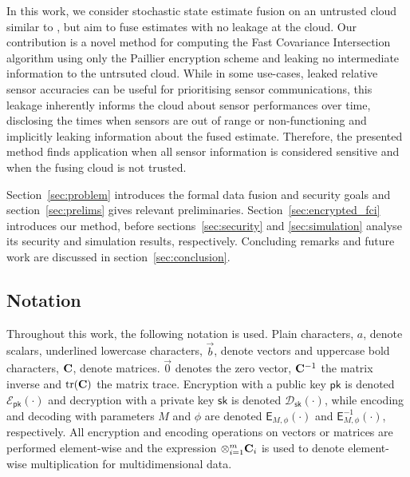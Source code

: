 \documentclass[letterpaper, 10 pt, conference]{ieeeconf}
\begin{document}
In this work, we consider stochastic state estimate fusion on an untrusted cloud similar to \cite{risticSecureFastCovariance2021}, but aim to fuse estimates with no leakage at the cloud. Our contribution is a novel method for computing the Fast Covariance Intersection algorithm using only the Paillier encryption scheme and leaking no intermediate information to the untrsuted cloud. While in some use-cases, leaked relative sensor accuracies can be useful for prioritising sensor communications, this leakage inherently informs the cloud about sensor performances over time, disclosing the times when sensors are out of range or non-functioning and implicitly leaking information about the fused estimate. Therefore, the presented method finds application when all sensor information is considered sensitive and when the fusing cloud is not trusted.

Section~\ref{sec:problem} introduces the formal data fusion and security goals and section~\ref{sec:prelims} gives relevant preliminaries. Section~\ref{sec:encrypted_fci} introduces our method, before sections~\ref{sec:security} and \ref{sec:simulation} analyse its security and simulation results, respectively. Concluding remarks and future work are discussed in section~\ref{sec:conclusion}.

\subsection{Notation}
Throughout this work, the following notation is used. Plain characters, $a$, denote scalars, underlined lowercase characters, $\vec{b}$, denote vectors and uppercase bold characters, ${{\mathbf{C}}}$, denote matrices. $\vec{0}$ denotes the zero vector, ${{\mathbf{C}}}^{-1}$ the matrix inverse and $\operatorname{tr}({{\mathbf{C}}})$ the matrix trace. Encryption with a public key $\mathsf{pk}$ is denoted $\mathcal{E}_{\mathsf{pk}}(\cdot)$ and decryption with a private key $\mathsf{sk}$ is denoted $\mathcal{D}_{\mathsf{sk}}(\cdot)$, while encoding and decoding with parameters $M$ and $\phi$ are denoted $\mathsf{E}_{M,\phi}(\cdot)$ and $\mathsf{E}^{-1}_{M,\phi}(\cdot)$, respectively. All encryption and encoding operations on vectors or matrices are performed element-wise and the expression $\otimes_{i=1}^{m}{{\mathbf{C}}}_i$ is used to denote element-wise multiplication for multidimensional data.

% 
%                                              
%                                              
%                                              
% 
\end{document}
